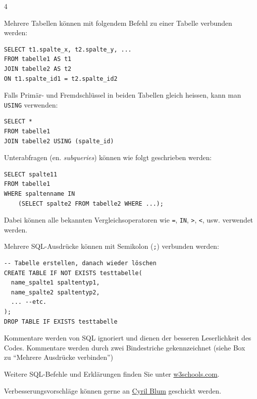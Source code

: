 \begin{landscape}
\begin{multicols*}{4}
\begin{cheatSheetBox}[title=Mehrere Tabellen verbinden: \texorpdfstring{\lstinline|JOIN|}{JOIN}]
Mehrere Tabellen können mit folgendem Befehl zu einer Tabelle verbunden werden:

\begin{lstlisting}
SELECT t1.spalte_x, t2.spalte_y, ...
FROM tabelle1 AS t1
JOIN tabelle2 AS t2
ON t1.spalte_id1 = t2.spalte_id2
\end{lstlisting}

Falls Primär- und Fremdschlüssel in beiden Tabellen gleich heissen, kann man \lstinline|USING| verwenden:
\begin{lstlisting}
SELECT *
FROM tabelle1 
JOIN tabelle2 USING (spalte_id)
\end{lstlisting}
\end{cheatSheetBox}

\begin{cheatSheetBox}[title=Unterabfragen (Subqueries)]
Unterabfragen (en. \textit{subqueries}) können wie folgt geschrieben werden:
\begin{lstlisting}
SELECT spalte11 
FROM tabelle1
WHERE spaltenname IN
    (SELECT spalte2 FROM tabelle2 WHERE ...);
\end{lstlisting}
Dabei können alle bekannten Vergleichsoperatoren wie \lstinline|=|, \lstinline|IN|, \lstinline|>|, \lstinline|<|, usw. verwendet werden.
\end{cheatSheetBox}

\begin{cheatSheetBox}[title=Mehrere Ausdrücke verbinden]
Mehrere SQL-Ausdrücke können mit Semikolon (\texttt{;}) verbunden werden:
\begin{lstlisting}
-- Tabelle erstellen, danach wieder löschen
CREATE TABLE IF NOT EXISTS testtabelle(
  name_spalte1 spaltentyp1,
  name_spalte2 spaltentyp2,
  ... --etc.
);
DROP TABLE IF EXISTS testtabelle
\end{lstlisting}
\end{cheatSheetBox}

\begin{cheatSheetBox}[title=Kommentare]
Kommentare werden von SQL ignoriert und dienen der besseren Leserlichkeit des Codes. Kommentare werden durch zwei Bindestriche gekennzeichnet (siehe Box zu \enquote{Mehrere Ausdrücke verbinden})
\end{cheatSheetBox}

\begin{cheatSheetBox}[title=Weitere Befehle \& Feedback]
Weitere \acrshort{SQL}-Befehle und Erklärungen finden Sie unter \href{https://www.w3schools.com/sql/default.asp}{w3schools.com}.

Verbesserungsvorschläge können gerne an \href{mailto:cyril.blum@edu.zh.ch}{Cyril Blum} geschickt werden.
\end{cheatSheetBox}

\end{multicols*}

\end{landscape}
\restoregeometry